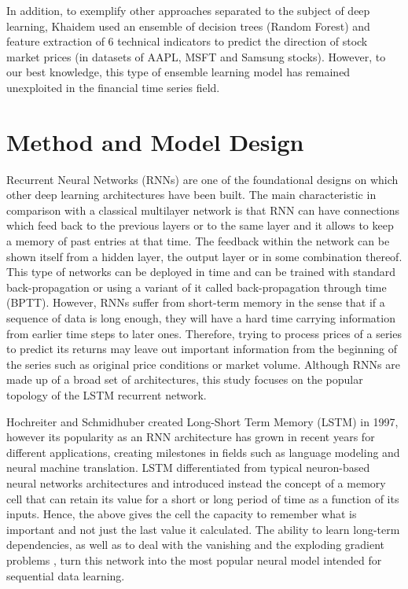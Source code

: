 \documentclass[10pt,twocolumn,letterpaper]{article}
\begin{document}
In addition, to exemplify other approaches separated to the subject of deep learning, Khaidem \etal \cite{Khaidem} used an ensemble of decision trees (Random Forest) and feature extraction of 6 technical indicators to predict the direction of stock market prices (in datasets of AAPL, MSFT and Samsung stocks). However, to our best knowledge, this type of ensemble learning model has remained unexploited in the financial time series field.

\section{Method and Model Design}

Recurrent Neural Networks (RNNs) are one of the foundational designs on which other deep learning architectures have been built. The main characteristic in comparison with a classical multilayer network is that RNN can have connections which feed back to the previous layers or to the same layer and it allows to keep a memory of past entries at that time. The feedback within the network can be shown itself from a hidden layer, the output layer or in some combination thereof. This type of networks can be deployed in time and can be trained with standard back-propagation or using a variant of it called back-propagation through time (BPTT). However, RNNs suffer from short-term memory in the sense that if a sequence of data is long enough, they will have a hard time carrying information from earlier time steps to later ones. Therefore, trying to process prices of a series to predict its returns may leave out important information from the beginning of the series such as original price conditions or market volume. Although RNNs are made up of a broad set of architectures, this study focuses on the popular topology of the LSTM recurrent network.

Hochreiter and Schmidhuber \cite{Schmidhuber} created Long-Short Term Memory (LSTM) in 1997, however its popularity as an RNN architecture has grown in recent years for different applications, creating milestones in fields such as language modeling and neural machine translation. LSTM differentiated from typical neuron-based neural networks architectures and introduced instead the concept of a memory cell that can retain its value for a short or long period of time as a function of its inputs. Hence, the above gives the cell the capacity to remember what is important and not just the last value it calculated. The ability to learn long-term dependencies, as well as to deal with the vanishing and the exploding gradient problems \cite{vanishing}, turn this network into the most popular neural model intended for sequential data learning.
\end{document}

